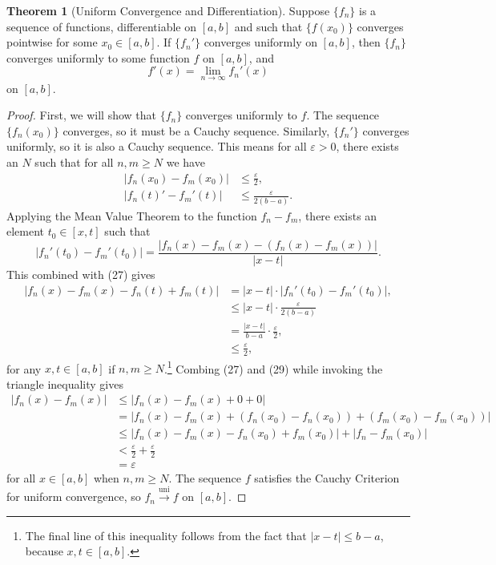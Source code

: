 \documentclass{article}
\newcommand{\uni}{\overset{\text{uni}}{\to}}
\theoremstyle{definition}
\newtheorem{theorem}{Theorem}[section]
\begin{document}
	\begin{theorem}[Uniform Convergence and Differentiation]
		Suppose $ \{f_n\} $ is a sequence of functions, differentiable on $ [a,b] $ and such that $ \{f(x_0)\} $ converges pointwise for some $ x_0\in[a,b] $. If $ \{f_n'\} $ converges uniformly on $ [a,b] $, then $ \{f_n\} $ converges uniformly to some function $ f $ on $ [a,b] $, and $$f'(x)=\lim\limits_{n\to\infty}f_n'(x) $$ on $ [a,b] $. 
	\end{theorem}
	\begin{proof}
		First, we will show that $ \{f_n\} $ converges uniformly to $ f $. The sequence $ \{f_n(x_0)\} $ converges, so it must be a Cauchy sequence. Similarly, $ \{f_n'\} $ converges uniformly, so it is also a Cauchy sequence. This means for all $ \varepsilon>0 $, there exists an $ N $ such that for all $ n,m\ge N $ we have \begin{align}
			|f_n(x_0)-f_m(x_0)|&\le \frac{\varepsilon}{2},\\|f_n(t)'-f_m'(t)|&\le \frac{\varepsilon}{2(b-a)}.
		\end{align}
		Applying the Mean Value Theorem to the function $ f_n-f_m $, there exists an element $ t_0\in[x,t] $ such that $$ |f_n'(t_0) - f_m'(t_0)|=\frac{|f_n(x)-f_m(x)-(f_n(x)-f_m(x))| }{|x-t|}.$$
		This combined with (27) gives 
		\begin{align}
			|f_n(x)-f_m(x)-f_n(t)+f_m(t)| &=|x-t|\cdot|f_n'(t_0) - f_m'(t_0)|,\nonumber\\&\le |x-t|\cdot \frac{\varepsilon}{2(b-a)}\\&=\frac{|x-t|}{b-a}\cdot\frac{\varepsilon}{2},\nonumber\\&\le \frac{\varepsilon}{2},
		\end{align}
		for any $ x,t\in[a,b] $ if $ n,m\ge N $.\footnote{The final line of this inequality follows from the fact that $ |x-t|\le b-a $, because $ x,t\in[a,b] $. } Combing (27) and (29)  while invoking the triangle inequality gives \begin{align*}
			|f_n(x)-f_m(x)|&\le |f_n(x)-f_m(x) + 0 + 0|\\&=|f_n(x)-f_m(x) + (f_n(x_0)-f_n(x_0)) + (f_m(x_0)-f_m(x_0))|\\&\le 	|f_n(x)-f_m(x)-f_n(x_0)+f_m(x_0)| + |f_n-f_m(x_0)| \\&<\frac{\varepsilon}{2}+\frac{\varepsilon}{2}\\&=\varepsilon
		\end{align*}
		for all $ x\in[a,b] $ when $ n,m\ge N $. The sequence $ f $ satisfies the Cauchy Criterion for uniform convergence, so $ f_n\uni f $ on $ [a,b] $. 
		

\end{proof}
\end{document}
